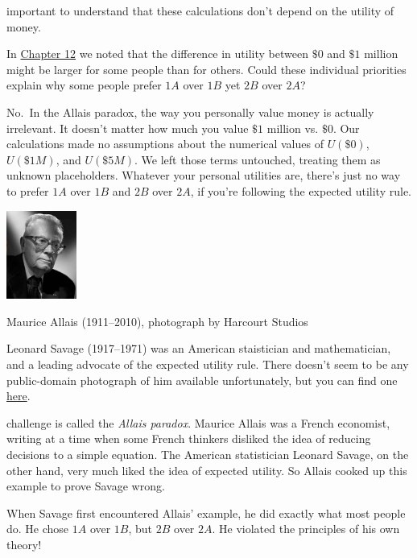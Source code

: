 \documentclass[justified]{tufte-book}
\renewcommand{\u}{U}
\theoremstyle{definition}
\theoremstyle{definition}
\theoremstyle{definition}
\theoremstyle{remark}
\begin{document}
 important to understand that these calculations don't depend on the utility of money.

In \protect\hyperlink{utility}{Chapter 12} we noted that the difference in utility between \(\$0\) and \(\$1\) million might be larger for some people than for others. Could these individual priorities explain why some people prefer \(1A\) over \(1B\) yet \(2B\) over \(2A\)?

No.~In the Allais paradox, the way you personally value money is actually irrelevant. It doesn't matter how much you value \(\$1\) million vs. \(\$0\). Our calculations made no assumptions about the numerical values of \(\u(\$0)\), \(\u(\$1M)\), and \(\u(\$5M)\). We left those terms untouched, treating them as unknown placeholders. Whatever your personal utilities are, there's just no way to prefer \(1A\) over \(1B\) and \(2B\) over \(2A\), if you're following the expected utility rule.

\begin{marginfigure}
\includegraphics[width=0.91in]{img/allais} \caption[Maurice Allais (1911--2010), photograph by Harcourt Studios]{Maurice Allais (1911--2010), photograph by Harcourt Studios}\label{fig:unnamed-chunk-115}
\end{marginfigure}
\begin{marginfigure}
Leonard Savage (1917--1971) was an American staistician and
mathematician, and a leading advocate of the expected utility rule.
There doesn't seem to be any public-domain photograph of him available
unfortunately, but you can find one
\href{http://policonomics.com/leonard-savage/}{here}.
\end{marginfigure}

 challenge is called the \emph{Allais paradox}. Maurice Allais was a French economist, writing at a time when some French thinkers disliked the idea of reducing decisions to a simple equation. The American statistician Leonard Savage, on the other hand, very much liked the idea of expected utility. So Allais cooked up this example to prove Savage wrong.

When Savage first encountered Allais' example, he did exactly what most people do. He chose \(1A\) over \(1B\), but \(2B\) over \(2A\). He violated the principles of his own theory!
\end{document}
